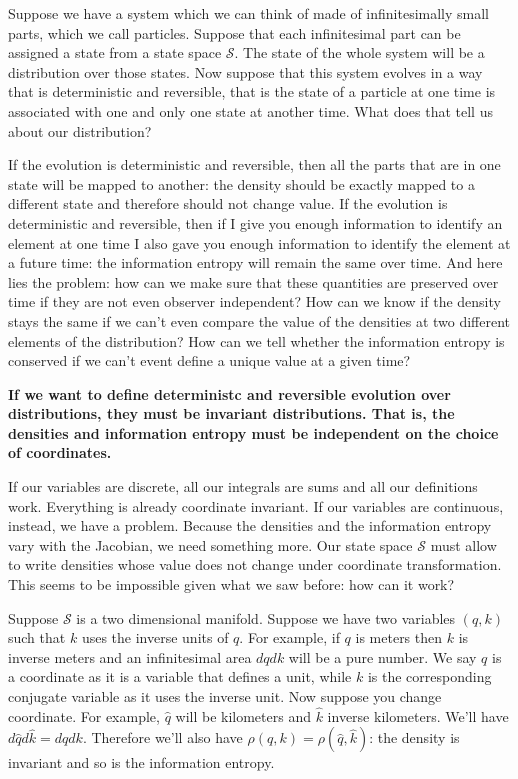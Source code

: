 \documentclass[11pt]{article}
\begin{document}
Suppose we have a system which we can think of made of infinitesimally small parts, which we call particles. Suppose  that each infinitesimal part can be assigned a state from a state space $\mathcal{S}$. The state of the whole system will be a distribution over those states. Now suppose that this system evolves in a way that is deterministic and reversible, that is the state of a particle at one time is associated with one and only one state at another time. What does that tell us about our distribution?

If the evolution is deterministic and reversible, then all the parts that are in one state will be mapped to another: the density should be exactly mapped to a different state and therefore should not change value. If the evolution is deterministic and reversible, then if I give you enough information to identify an element at one time I also gave you enough information to identify the element at a future time: the information entropy will remain the same over time. And here lies the problem: how can we make sure that these quantities are preserved over time if they are not even observer independent? How can we know if the density stays the same if we can't even compare the value of the densities at two different elements of the distribution? How can we tell whether the information entropy is conserved if we can't event define a unique value at a given time?

\textbf{If we want to define deterministc and reversible evolution over distributions, they must be invariant distributions. That is, the densities and information entropy must be independent on the choice of coordinates.}

If our variables are discrete, all our integrals are sums and all our definitions work. Everything is already coordinate invariant. If our variables are continuous, instead, we have a problem. Because the densities and the information entropy vary with the Jacobian, we need something more. Our state space $\mathcal{S}$ must allow to write densities whose value does not change under coordinate transformation. This seems to be impossible given what we saw before: how can it work?

Suppose $\mathcal{S}$ is a two dimensional manifold. Suppose we have two variables $(q,k)$ such that $k$ uses the inverse units of $q$. For example, if $q$ is meters then $k$ is inverse meters and an infinitesimal area $dq dk$ will be a pure number. We say $q$ is a coordinate as it is a variable that defines a unit, while $k$ is the corresponding conjugate variable as it uses the inverse unit. Now suppose you change coordinate. For example, $\hat{q}$ will be kilometers and $\hat{k}$ inverse kilometers. We'll have $d\hat{q} d\hat{k} = dq dk$. Therefore we'll also have $\rho(q,k) = \rho(\hat{q}, \hat{k})$: the density is invariant and so is the information entropy.
\end{document}
